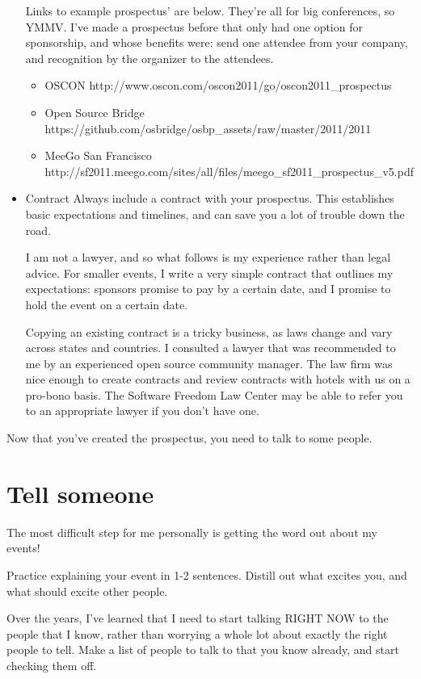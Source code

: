 \begin{itemize}
Links to example prospectus’ are below. They’re all for big conferences, so YMMV. I’ve made a prospectus before that only had one option for sponsorship, and whose benefits were: send one attendee from your company, and recognition by the organizer to the attendees. 

\begin{itemize}
\item OSCON http://www.oscon.com/oscon2011/go/oscon2011_prospectus
\item Open Source Bridge https://github.com/osbridge/osbp_assets/raw/master/2011/2011%
\item MeeGo San Francisco http://sf2011.meego.com/sites/all/files/meego_sf2011_prospectus_v5.pdf
\end{itemize}

\item Contract
Always include a contract with your prospectus. This establishes basic expectations and timelines, and can save you a lot of trouble down the road.

I am not a lawyer, and so what follows is my experience rather than legal advice. For smaller events, I write a very simple contract that outlines my expectations: sponsors promise to pay by a certain date, and I promise to hold the event on a certain date.

Copying an existing contract is a tricky business, as laws change and vary across states and countries. I consulted a lawyer that was recommended to me by an experienced open source community manager. The law firm was nice enough to create contracts and review contracts with hotels with us on a pro-bono basis. The Software Freedom Law Center may be able to refer you to an appropriate lawyer if you don’t have one.
\end{itemize}

Now that you’ve created the prospectus, you need to talk to some people.

\section*{Tell someone}
The most difficult step for me personally is getting the word out about my events! 

Practice explaining your event in 1-2 sentences. Distill out what excites you, and what should excite other people.

Over the years, I’ve learned that I need to start talking RIGHT NOW to the people that I know, rather than worrying a whole lot about exactly the right people to tell.  Make a list of people to talk to that you know already, and start checking them off.

